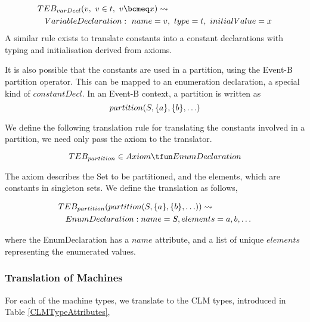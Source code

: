 \begin{equation}
\begin{split}
&TEB_{varDecl}(v,~ v\in t,~ v\bcmeq x) \leadsto\\ 
&\hspace*{0.3cm}VariableDeclaration:~ name = v,~ type = t,~ initialValue = x
\end{split}
\notag
\end{equation}
%
A similar rule exists to translate constants into a constant declarations with typing and initialisation derived from axioms. 

It is also possible that the constants are used in a partition, using the Event-B partition operator. This can be mapped to an enumeration declaration, a special kind of $constantDecl$. In an Event-B context, a partition is written as 
%
\begin{equation}
partition(S,\{a\},\{b\},\ldots)
\notag
\end{equation}

We define the following translation rule for translating the constants involved in a partition, we need only pass the axiom to the translator. 

\begin{equation}
TEB_{partition} \in Axiom \tfun EnumDeclaration
\notag
\end{equation}

The axiom describes the Set to be partitioned, and the elements, which are constants in singleton sets. We define the translation as follows, 

\begin{equation}
\begin{split}
&TEB_{partition}(partition(S,\{a\},\{b\},\ldots)) \leadsto\\
&\hspace*{0.3cm}EnumDeclaration: name = S, elements = { a, b, \ldots }
\end{split}
\notag
\end{equation}

where the EnumDeclaration has a $name$ attribute, and a list of unique $elements$ representing the enumerated values.

\subsubsection{Translation of Machines}

 For each of the machine types,  we translate to the CLM types, introduced in Table \ref{CLMTypeAttributes},

